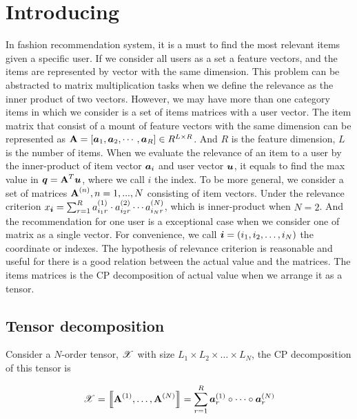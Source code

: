 \documentclass{article}
\newcommand{\Sca}[3]{{#1}^{(#2)}_{i_#2#3}}%
\newcommand{\T}[1]{\boldsymbol{\mathscr{\MakeUppercase{#1}}}}%
\newcommand{\V}[1]{{\bm{{\MakeLowercase{#1}}}}}%
\newcommand{\VnC}[3]{\V{#1}^{(#2)}_{#3}}%
\newcommand{\M}[1]{{\bm{\mathbf{\MakeUppercase{#1}}}}}%
\newcommand{\Mn}[2]{\M{#1}^{(#2)}}%
\newcommand{\KT}[1]{\left\llbracket #1 \right\rrbracket}
\begin{document}
\title{}
\date{}
\author{}
\maketitle



\section{Introducing}

In fashion recommendation system, it is a must to find the most relevant items given a specific user. If we consider all users as a set a feature vectors, and the items are represented by vector with the same dimension. This problem can be abstracted to matrix multiplication tasks when we define the relevance as the inner product of two vectors. However, we may have more than one category items in which we consider is a set of items matrices with a user vector. The item matrix that consist of a mount of feature vectors with the same dimension can be represented as $\M{A} =
[\V{a}_{1},\V{a}_{2},\cdots,\V{a}_{R}]\in R^{L\times R}$. And $R$ is the feature dimension, $L$ is the number of items. When we evaluate the relevance of an item to a user by the inner-product of item vector $\V{a}_{i}$ and user vector $\V{u}$, it equals to find the max value in $\V{q} = \M{a}^T\V{u}$, where we call $i$ the index. To be more general, we consider a set of matrices $\M{A}^{(n)},n = 1,...,N$ consisting of item vectors. Under the relevance criterion $x_\V{i} = \sum_{r=1}^{R}\Sca{a}{1}{r}\cdot\Sca{a}{2}{r}\cdots\Sca{a}{N}{r}$, which is inner-product when $N=2$. And the recommendation for one user is a exceptional case when we consider one of matrix as a single vector. For convenience, we call $\V{i} = (i_1,i_2,\ldots,i_N)$ the coordinate or indexes. The hypothesis of relevance criterion is reasonable and useful for there is a good relation between the actual value and the matrices. The items matrices is the CP decomposition of actual value when we arrange it as a tensor.

\subsection{Tensor decomposition}

Consider a $N$-order tensor, $\T{X}$ with size $L_1\times L_2\times\ldots\times L_N$, the CP decomposition of this tensor is

\begin{equation}\label{eq:CPDecomposition}
\T{X}= \KT{ \Mn{A}{1},\dots,\Mn{A}{N}} =
\sum_{r=1}^{R}\VnC{A}{1}{r} \circ \cdots \circ \VnC{A}{N}{r}
\end{equation}
\end{document}

